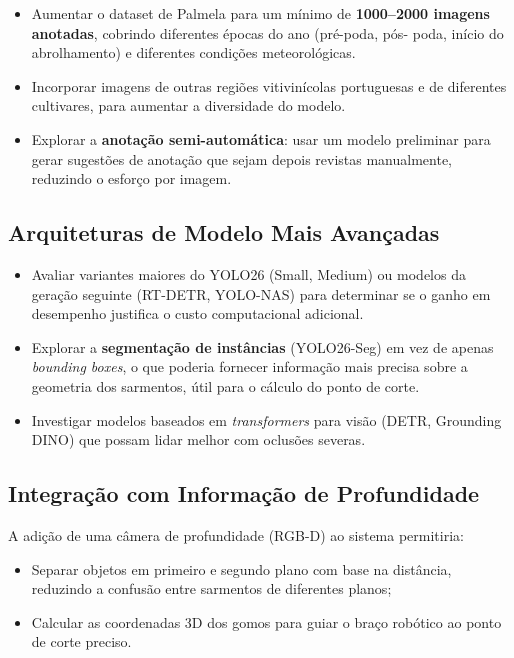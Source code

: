 \begin{itemize}
  \item Aumentar o dataset de Palmela para um mínimo de \textbf{1000--2000
    imagens anotadas}, cobrindo diferentes épocas do ano (pré-poda, pós-
    poda, início do abrolhamento) e diferentes condições meteorológicas.

  \item Incorporar imagens de outras regiões vitivinícolas portuguesas e
    de diferentes cultivares, para aumentar a diversidade do modelo.

  \item Explorar a \textbf{anotação semi-automática}: usar um modelo
    preliminar para gerar sugestões de anotação que sejam depois revistas
    manualmente, reduzindo o esforço por imagem.
\end{itemize}

\subsection{Arquiteturas de Modelo Mais Avançadas}

\begin{itemize}
  \item Avaliar variantes maiores do YOLO26 (Small, Medium) ou modelos da
    geração seguinte (RT-DETR, YOLO-NAS) para determinar se o ganho
    em desempenho justifica o custo computacional adicional.

  \item Explorar a \textbf{segmentação de instâncias} (YOLO26-Seg) em vez
    de apenas \textit{bounding boxes}, o que poderia fornecer informação
    mais precisa sobre a geometria dos sarmentos, útil para o cálculo do
    ponto de corte.

  \item Investigar modelos baseados em \textit{transformers} para visão
    (DETR, Grounding DINO) que possam lidar melhor com oclusões severas.
\end{itemize}

\subsection{Integração com Informação de Profundidade}

A adição de uma câmera de profundidade (RGB-D) ao sistema permitiria:

\begin{itemize}
  \item Separar objetos em primeiro e segundo plano com base na distância,
    reduzindo a confusão entre sarmentos de diferentes planos;

  \item Calcular as coordenadas 3D dos gomos para guiar o braço robótico
    ao ponto de corte preciso.
\end{itemize}

